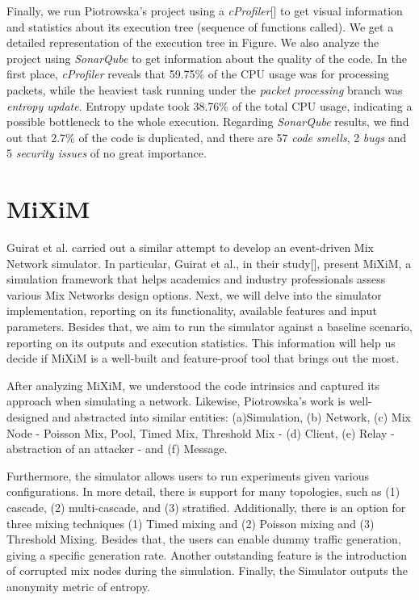 \documentclass[logo,msc,cyber]{infthesis}   %
\begin{document}
Finally, we run Piotrowska's project using a \emph{cProfiler}[] to get visual
information and statistics about its execution tree (sequence of functions
called). We get a detailed representation of the execution tree in Figure. We
also analyze the project using \emph{SonarQube} to get information about the
quality of the code. In the first place, \emph{cProfiler} reveals that 59.75\%
of the CPU usage was for processing packets, while the heaviest task running
under the \emph{packet processing} branch was \emph{entropy update}. Entropy
update took 38.76\% of the total CPU usage, indicating a possible bottleneck to
the whole execution. Regarding \emph{SonarQube} results, we find out that 2.7\%
of the code is duplicated, and there are 57 \emph{code smells}, 2 \emph{bugs}
and 5 \emph{security issues} of no great importance.

\section{MiXiM}

Guirat et al. carried out a similar attempt to develop an event-driven Mix
Network simulator. In particular, Guirat et al., in their study[], present
MiXiM, a simulation framework that helps academics and industry professionals
assess various Mix Networks design options. Next, we will delve into the
simulator implementation, reporting on its functionality, available features and
input parameters. Besides that, we aim to run the simulator against a baseline
scenario, reporting on its outputs and execution statistics. This information
will help us decide if MiXiM is a well-built and feature-proof tool that brings
out the most.

After analyzing MiXiM, we understood the code intrinsics and captured its
approach when simulating a network. Likewise, Piotrowska's work is well-designed
and abstracted into similar entities: (a)Simulation, (b) Network, (c) Mix Node -
Poisson Mix, Pool, Timed Mix, Threshold Mix - (d) Client, (e) Relay -
abstraction of an attacker - and (f) Message.


Furthermore, the simulator allows users to run experiments given various
configurations. In more detail, there is support for many topologies, such as
(1) cascade, (2) multi-cascade, and (3) stratified. Additionally, there is an
option for three mixing techniques (1) Timed mixing and (2) Poisson mixing and
(3) Threshold Mixing. Besides that, the users can enable dummy traffic
generation, giving a specific generation rate. Another outstanding feature is
the introduction of corrupted mix nodes during the simulation. Finally, the
Simulator outputs the anonymity metric of entropy.
\end{document}
